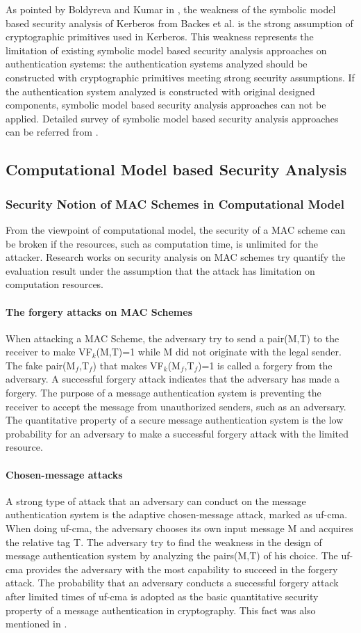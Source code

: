 \documentclass{article}
\begin{document}
As pointed by Boldyreva and Kumar in \cite{computational-kerberos}, the weakness of the symbolic model based security
analysis of Kerberos from Backes et al. is the strong assumption of
cryptographic primitives used in Kerberos. This weakness represents the limitation
of existing symbolic model based security analysis approaches on authentication
systems: the authentication systems analyzed should be constructed with
cryptographic primitives meeting strong security assumptions. If the
authentication system analyzed is constructed with original designed components,
symbolic model based security analysis approaches can not be applied. 
Detailed survey of symbolic model based security analysis approaches can be
referred from \cite{symbolic-survey}.

\subsection{Computational Model based Security Analysis}
\subsubsection{Security Notion of MAC Schemes in Computational Model}
From the viewpoint of computational model, the security of a MAC scheme can be
broken if the resources, such as computation time, is unlimited for the
attacker. Research works on
security analysis on MAC schemes try quantify the evaluation result under the assumption that the attack has limitation on computation resources.
\paragraph{The forgery attacks on MAC Schemes}
When attacking a MAC Scheme, the adversary try to send a pair(M,T) to the receiver to make VF$_k$(M,T)=1 while M did not originate with the legal sender. The fake pair(M$_f$,T$_f$) that makes VF$_k$(M$_f$,T$_f$)=1 is called a forgery from the adversary. A successful forgery attack indicates that the adversary has made a forgery. 
The purpose of a message authentication system is preventing the receiver to accept the message from unauthorized senders, such as an adversary. The quantitative property of a secure message authentication system is the low probability for an adversary to make a successful forgery attack with the limited resource.
\paragraph{Chosen-message attacks}
A strong type of attack that an adversary can conduct on the message authentication system is the adaptive chosen-message attack, marked as uf-cma. When doing uf-cma, the adversary chooses its own input message M and acquires the relative tag T. The adversary try to find the weakness in the design of message authentication system by analyzing the pairs(M,T) of his choice. The uf-cma provides the adversary with the most capability to succeed in the forgery attack. The probability that an adversary conducts a successful forgery attack after limited times of uf-cma is adopted as the basic quantitative security property of a message authentication in cryptography. This fact was also mentioned in \cite{Rogaway2011}.
\end{document}
